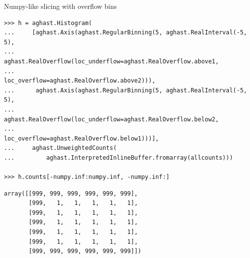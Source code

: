 \documentclass[aspectratio=169]{beamer}
\begin{document}
\begin{frame}[fragile]{Numpy-like slicing with overflow bins}
\begin{onlyenv}
\begin{verbatim}
>>> h = aghast.Histogram(
...     [aghast.Axis(aghast.RegularBinning(5, aghast.RealInterval(-5, 5),
...                  aghast.RealOverflow(loc_underflow=aghast.RealOverflow.above1,
...                                      loc_overflow=aghast.RealOverflow.above2))),
...      aghast.Axis(aghast.RegularBinning(5, aghast.RealInterval(-5, 5),
...                  aghast.RealOverflow(loc_underflow=aghast.RealOverflow.below2,
...                                      loc_overflow=aghast.RealOverflow.below1)))],
...     aghast.UnweightedCounts(
...         aghast.InterpretedInlineBuffer.fromarray(allcounts)))

>>> h.counts[-numpy.inf:numpy.inf, -numpy.inf:]
\end{verbatim}
\begin{verbatim}
array([[999, 999, 999, 999, 999, 999], 
       [999,   1,   1,   1,   1,   1], 
       [999,   1,   1,   1,   1,   1], 
       [999,   1,   1,   1,   1,   1], 
       [999,   1,   1,   1,   1,   1], 
       [999,   1,   1,   1,   1,   1], 
       [999, 999, 999, 999, 999, 999]])
\end{verbatim}
\end{onlyenv}
\end{frame}
\end{document}
